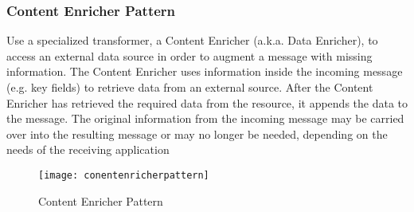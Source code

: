 \subsubsection{Content Enricher Pattern}
Use a specialized transformer, a Content Enricher (a.k.a. Data Enricher), to access an external data source in order to augment a message with missing information. The Content Enricher uses information inside the incoming message (e.g. key fields) to retrieve data from an external source. After the Content Enricher has retrieved the required data from the resource, it appends the data to the message. The original information from the incoming message may be carried over into the resulting message or may no longer be needed, depending on the needs of the receiving application

\begin{figure}[H]
  \center
  \texttt{[image: conentenricherpattern]}
  \caption{Content Enricher Pattern}
\end{figure}

